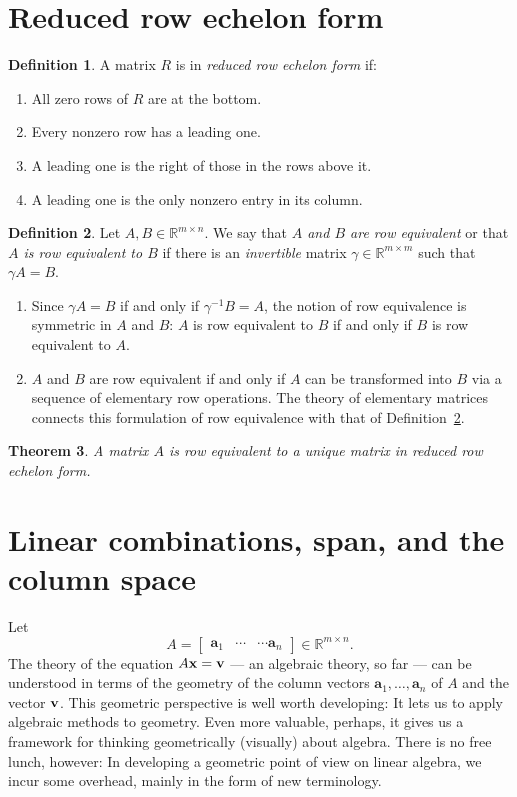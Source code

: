 \documentclass[12pt]{amsart}
\newcommand{\RR}{\mathbb{R}} \DeclareMathOperator{\rref}{rref}
\newtheorem{theorem}{Theorem}[section]
\theoremstyle{definition} \newtheorem{definition}[theorem]{Definition}
\newcommand{\ba}{\mathbf{a}} \newcommand{\bb}{\mathbf{b}}
\newcommand{\bas}{\ba_1,\ldots,\ba_n}
\newcommand{\mat}[1]{\begin{bmatrix}#1\end{bmatrix}}
\begin{document}
\section{Reduced row echelon form}


\begin{definition}\label{df:rref}
  A matrix $R$ is in \emph{reduced row echelon form} if:
  \begin{enumerate}
    \item All zero rows of $R$ are at the bottom.
    \item Every nonzero row has a leading one.
    \item A	leading one is the right of those in the rows above it.
    \item A leading one is the only nonzero entry in its column.
  \end{enumerate}
\end{definition}

\begin{definition}\label{df:row_equiv}
  Let $A, B\in \RR^{m\times n}$.
  We say that \emph{$A$ and $B$ are row equivalent} or that \emph{$A$ is row equivalent to $B$} if there is an \emph{invertible} matrix $\gamma\in\RR^{m\times m}$ such that $\gamma A=B$.
\end{definition}

\begin{remarks}\hfill \begin{enumerate}
  \item Since $\gamma A=B$ if and only if
	$\gamma^{-1} B=A$, the notion of row equivalence is symmetric in $A$ and $B$: $A$ is row equivalent to $B$ if and only if $B$ is row equivalent to $A$.

  \item $A$ and $B$ are row equivalent if and only if $A$ can
	be transformed into $B$ via a sequence of elementary row operations.
	The theory of elementary matrices connects this formulation of row
	equivalence with that of Definition~\ref{df:row_equiv}.
	\end{enumerate}
\end{remarks}

\begin{theorem}\label{th:rref_existence_uniqueness}
  A matrix $A$ is row equivalent to a unique matrix in reduced row echelon form.
\end{theorem}

\section{Linear combinations, span, and the column space}
Let
\[
  A = \mat{\ba_1&\cdots&\cdots \ba_n}\in\RR^{m\times n}.
\]
The theory of the equation $A\mathbf{x}=\mathbf{v}$ --- an algebraic theory, so far --- can be understood in terms of the geometry of the column vectors $\bas$ of $A$ and the vector $\mathbf{v}$.
This geometric perspective is well worth developing:
It lets us to apply algebraic methods to geometry.
Even more valuable, perhaps, it gives us a framework for thinking geometrically (visually) about algebra. 
There is no free lunch, however:
In developing a geometric point of view on linear algebra, we incur some overhead, mainly in the form of new terminology.
\end{document}
